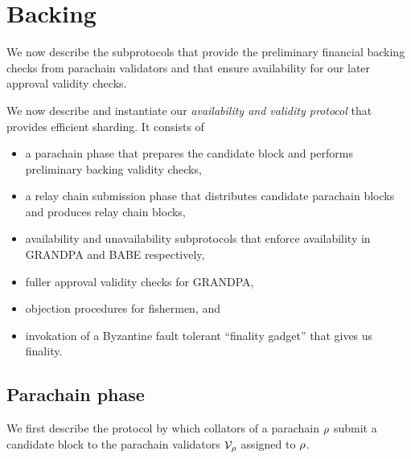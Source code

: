 
\section{Backing}
\label{sec:backing}

We now describe the subprotocols that provide the preliminary financial backing checks from parachain validators and that ensure availability for our later approval validity checks.


We now describe and instantiate our {\em availability and validity protocol} that provides efficient sharding.  It consists of 
\begin{itemize}
\item a parachain phase that prepares the candidate block and performs preliminary backing validity checks,
\item a relay chain submission phase that distributes candidate parachain blocks and produces relay chain blocks,
\item availability and unavailability subprotocols that enforce availability in GRANDPA and BABE respectively,
\item fuller approval validity checks for GRANDPA,
\item objection procedures for fishermen, and
\item invokation of a Byzantine fault tolerant ``finality gadget'' that gives us finality.
\end{itemize}




\subsection{Parachain phase} 
\label{sec:parachain}

We first describe the protocol by which collators of a parachain $\rho$ submit a candidate block to the parachain validators $\mathcal{V}_{\rho}$ assigned to $\rho$.

\smallskip

